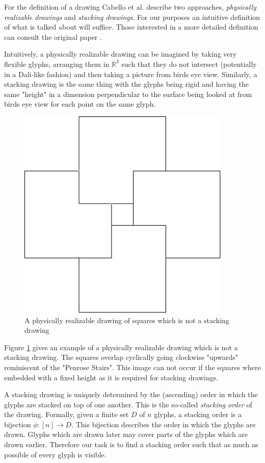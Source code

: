 \documentclass[a4paper,11pt]{article}
\begin{document}
For the definition of a drawing Cabello et al. describe two approaches, \textit{physically realizable drawings} and \textit{stacking drawings}. For our purposes an intuitive definition of what is talked about will suffice. Those interested in a more detailed definition can consult the original paper \cite{cabello}.

Intuitively, a physically realizable drawing can be imagined by taking very flexible glyphs, arranging them in $\mathbb{R}^3$ such that they do not intersect (potentially in a Dali-like fashion) and then taking a picture from birds eye view.
Similarly, a stacking drawing is the same thing with the glyphs being rigid and having the same "height" in a dimension perpendicular to the surface being looked at from birds eye view for each point on the same glyph.

%
\begin{figure}[H]
  \centering
  \includegraphics[width=0.4\linewidth]{phys_real_squares.png}
  \caption{A physically realizable drawing of squares which is not a stacking drawing}
  \label{fig:physicalSquares}
\end{figure}
%

Figure \ref{fig:physicalSquares} gives an example of a physically realizable drawing which is not a stacking drawing. The squares overlap cyclically going clockwise "upwards" reminiscent of the "Penrose Stairs". This image can not occur if the squares where embedded with a fixed height as it is required for stacking drawings.

A stacking drawing is uniquely determined by the (ascending) order in which the glyphs are stacked on top of one another. This is the so-called \textit{stacking order} of the drawing. Formally, given a finite set $D$ of $n$ glyphs, a stacking order is a bijection $\phi: [n]\rightarrow D$. This bijection describes the order in which the glyphs are drawn. Glyphs which are drawn later may cover parts of the glyphs which are drawn earlier. Therefore our task is to find a stacking order such that as much as possible of every glyph is visible.
\end{document}
